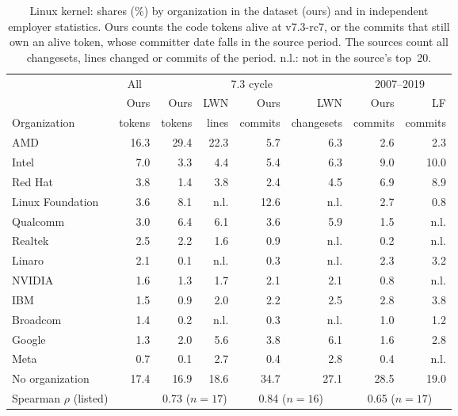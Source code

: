 \begin{table}[t]
\centering
\footnotesize
\setlength{\tabcolsep}{3.5pt}
\caption{Linux kernel: shares (\%) by organization in the dataset (ours) and in independent
employer statistics. Ours counts the code tokens alive at v7.3-rc7, or the commits that still own
an alive token, whose committer date falls in the source period. The sources count all
changesets, lines changed or commits of the period. n.l.: not in the source's top~20.}
\label{tab:linux-validation}
\begin{tabular}{@{}lrrrrrrr@{}}
\toprule
 & \multicolumn{1}{c}{All} & \multicolumn{4}{c}{7.3 cycle} & \multicolumn{2}{c}{2007--2019} \\
\cmidrule(lr){2-2}\cmidrule(lr){3-6}\cmidrule(l){7-8}
 & Ours & Ours & LWN & Ours & LWN & Ours & LF \\
Organization & tokens & tokens & lines & commits & changesets & commits & commits \\
\midrule
AMD              & 16.3 & 29.4 & 22.3 & 5.7  & 6.3  & 2.6 & 2.3  \\
Intel            & 7.0  & 3.3  & 4.4  & 5.4  & 6.3  & 9.0 & 10.0 \\
Red Hat          & 3.8  & 1.4  & 3.8  & 2.4  & 4.5  & 6.9 & 8.9  \\
Linux Foundation & 3.6  & 8.1  & n.l. & 12.6 & n.l. & 2.7 & 0.8  \\
Qualcomm         & 3.0  & 6.4  & 6.1  & 3.6  & 5.9  & 1.5 & n.l. \\
Realtek          & 2.5  & 2.2  & 1.6  & 0.9  & n.l. & 0.2 & n.l. \\
Linaro           & 2.1  & 0.1  & n.l. & 0.3  & n.l. & 2.3 & 3.2  \\
NVIDIA           & 1.6  & 1.3  & 1.7  & 2.1  & 2.1  & 0.8 & n.l. \\
IBM              & 1.5  & 0.9  & 2.0  & 2.2  & 2.5  & 2.8 & 3.8  \\
Broadcom         & 1.4  & 0.2  & n.l. & 0.3  & n.l. & 1.0 & 1.2  \\
Google           & 1.3  & 2.0  & 5.6  & 3.8  & 6.1  & 1.6 & 2.8  \\
Meta             & 0.7  & 0.1  & 2.7  & 0.4  & 2.8  & 0.4 & n.l. \\
\midrule
No organization  & 17.4 & 16.9 & 18.6 & 34.7 & 27.1 & 28.5 & 19.0 \\
\midrule
Spearman $\rho$ (listed) & & \multicolumn{2}{c}{0.73 ($n=17$)} & \multicolumn{2}{c}{0.84 ($n=16$)} & \multicolumn{2}{c}{0.65 ($n=17$)} \\
\bottomrule
\end{tabular}
\end{table}
